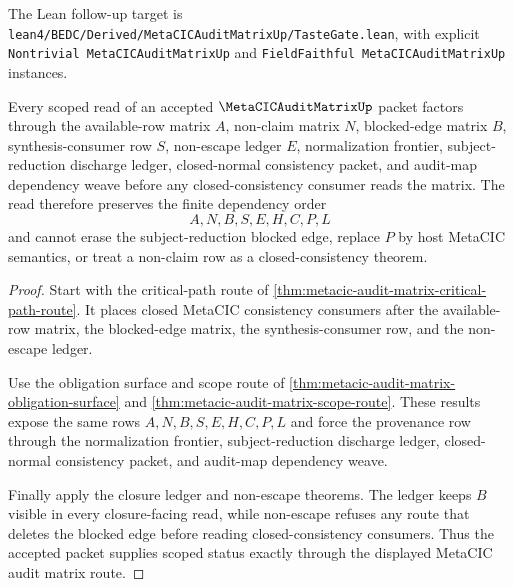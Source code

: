 
The Lean follow-up target is \texttt{lean4/BEDC/Derived/MetaCICAuditMatrixUp/TasteGate.lean}, with explicit \texttt{Nontrivial MetaCICAuditMatrixUp} and \texttt{FieldFaithful MetaCICAuditMatrixUp} instances.

\begin{theorem}
\label{thm:metacic-audit-matrix-scoped-status}
Every scoped read of an accepted $\MetaCICAuditMatrixUp$ packet factors through the available-row matrix $A$, non-claim matrix $N$, blocked-edge matrix $B$, synthesis-consumer row $S$, non-escape ledger $E$, normalization frontier, subject-reduction discharge ledger, closed-normal consistency packet, and audit-map dependency weave before any closed-consistency consumer reads the matrix. The read therefore preserves the finite dependency order
$$
A,N,B,S,E,H,C,P,L
$$
and cannot erase the subject-reduction blocked edge, replace $P$ by host MetaCIC semantics, or treat a non-claim row as a closed-consistency theorem.
\end{theorem}
\begin{proof}
Start with the critical-path route of \autoref{thm:metacic-audit-matrix-critical-path-route}. It places closed MetaCIC consistency consumers after the available-row matrix, the blocked-edge matrix, the synthesis-consumer row, and the non-escape ledger.

Use the obligation surface and scope route of \autoref{thm:metacic-audit-matrix-obligation-surface} and \autoref{thm:metacic-audit-matrix-scope-route}. These results expose the same rows $A,N,B,S,E,H,C,P,L$ and force the provenance row through the normalization frontier, subject-reduction discharge ledger, closed-normal consistency packet, and audit-map dependency weave.

Finally apply the closure ledger and non-escape theorems. The ledger keeps $B$ visible in every closure-facing read, while non-escape refuses any route that deletes the blocked edge before reading closed-consistency consumers. Thus the accepted packet supplies scoped status exactly through the displayed MetaCIC audit matrix route.
\end{proof}

